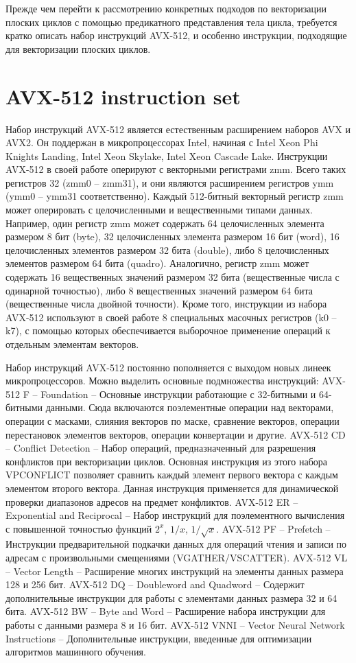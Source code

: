 \documentclass[
11pt,%
tightenlines,%
twoside,%
onecolumn,%
nofloats,%
nobibnotes,%
nofootinbib,%
superscriptaddress,%
noshowpacs,%
centertags]%
{revtex4}
\begin{document}
Прежде чем перейти к рассмотрению конкретных подходов по векторизации плоских циклов с помощью предикатного представления тела цикла, требуется кратко описать набор инструкций AVX-512, и особенно инструкции, подходящие для векторизации плоских циклов.

\section{AVX-512 instruction set}

Набор инструкций AVX-512 является естественным расширением наборов AVX и AVX2.
Он поддержан в микропроцессорах Intel, начиная с Intel Xeon Phi Knights Landing, Intel Xeon Skylake, Intel Xeon Cascade Lake.
Инструкции AVX-512 в своей работе оперируют с векторными регистрами zmm.
Всего таких регистров 32 (zmm0 -- zmm31), и они являются расширением регистров ymm (ymm0 -- ymm31 соответственно).
Каждый 512-битный векторный регистр zmm может оперировать с целочисленными и вещественными типами данных.
Например, один регистр zmm может содержать 64 целочисленных элемента размером 8 бит (byte), 32 целочисленных элемента размером 16 бит (word), 16 целочисленных элементов размером 32 бита (double), либо 8 целочисленных элементов размером 64 бита (quadro).
Аналогично, регистр zmm может содержать 16 вещественных значений размером 32 бита (вещественные числа с одинарной точностью), либо 8 вещественных значений размером 64 бита (вещественные числа двойной точности).
Кроме того, инструкции из набора AVX-512 используют в своей работе 8 специальных масочных регистров (k0 -- k7), с помощью которых обеспечивается выборочное применение операций к отдельным элементам векторов.
    
Набор инструкций AVX-512 постоянно пополняется с выходом новых линеек микропроцессоров.
Можно выделить основные подмножества инструкций:
AVX-512 F -- Foundation -- Основные инструкции работающие с 32-битными и 64-битными данными.
Сюда включаются поэлементные операции над векторами, операции с масками, слияния векторов по маске, сравнение векторов, операции перестановок элементов векторов, операции конвертации и другие.
AVX-512 CD -- Conflict Detection -- Набор операций, предназначенный для разрешения конфликтов при векторизации циклов. Основная инструкция из этого набора VPCONFLICT позволяет сравнить каждый элемент первого вектора с каждым элементом второго вектора. Данная инструкция применяется для динамической проверки диапазонов адресов на предмет конфликтов.
AVX-512 ER -- Exponential and Reciprocal -- Набор инструкций для поэлементного вычисления с повышенной точностью функций $2^x$, $1/x$, $1/\sqrt{x}$.
AVX-512 PF -- Prefetch -- Инструкции предварительной подкачки данных для операций чтения и записи по адресам с произвольными смещениями (VGATHER/VSCATTER).
AVX-512 VL -- Vector Length -- Расширение многих инструкций на элементы данных размера 128 и 256 бит.
AVX-512 DQ -- Doubleword and Quadword -- Содержит дополнительные инструкции для работы с элементами данных размера 32 и 64 бита.
AVX-512 BW -- Byte and Word -- Расширение набора инструкции для работы с данными размера 8 и 16 бит. 
AVX-512 VNNI -- Vector Neural Network Instructions -- Дополнительные инструкции, введенные для оптимизации алгоритмов машинного обучения.
\end{document}
